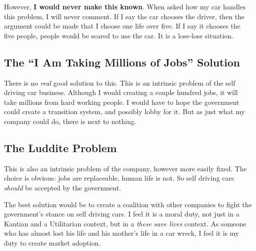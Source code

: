 \documentclass[12pt]{article}
\begin{document}
However, \textbf{I would never make this known}. When asked how my car handles this problem, I will never comment. If I say the car chooses the driver, then the argument could be made that I choose one life over five. If I say it chooses the five people, people would be scared to use the car. It is a lose-lose situation.

\subsection{\texorpdfstring{The ``I Am Taking Millions of Jobs'' Solution}{The I Am Taking Millions of Jobs Solution}}\label{the-i-am-taking-millions-of-jobs-solution}

There is no \emph{real} good solution to this. This is an intrinsic problem of the self driving car business. Although I would creating a couple hundred jobs, it will take millions from hard working people. I would have to hope the government could create a transition system, and possibly lobby for it. But as just what my company could do, there is next to nothing.

\subsection{The Luddite Problem}\label{the-luddite-problem-1}

This is also an intrinsic problem of the company, however more easily fixed. The choice is obvious: jobs are replaceable, human life is not. So self driving cars \emph{should} be accepted by the government.

The best solution would be to create a coalition with other companies to fight the government's stance on self driving cars. I feel it is a moral duty, not just in a Kantian and a Utilitarian context, but in a \emph{these save lives} context. As someone who has almost lost his life and his mother's life in a car wreck, I feel it is my duty to create market adoption.
\end{document}
